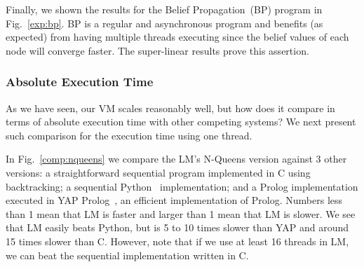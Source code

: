 Finally, we shown the results for the Belief Propagation~(BP) program in Fig.~\ref{exp:bp}. BP is a regular and asynchronous program
and benefits (as expected) from having multiple threads executing since the belief values of each node will converge faster.
The super-linear results prove this assertion.

\subsubsection{Absolute Execution Time}

As we have seen, our VM scales reasonably well, but how does it compare in terms of absolute execution time
with other competing systems? We next present such comparison for the execution time using one thread.

In Fig.~\ref{comp:nqueens} we compare the LM's N-Queens version against 3 other versions: a straightforward sequential program implemented
in C using backtracking; a sequential Python~\cite{vanRossum:1995:PRM}
implementation; and a Prolog implementation executed in
YAP Prolog~\cite{DBLP:journals/corr/abs-1102-3896}, an efficient implementation of Prolog. Numbers less than 1 mean that LM
is faster and larger than 1 mean that LM is slower. We see that LM easily beats Python, but is 5 to 10 times slower than YAP
and around 15 times slower than C.
However, note that if we use at least 16 threads in LM, we can beat the sequential implementation written in C.

